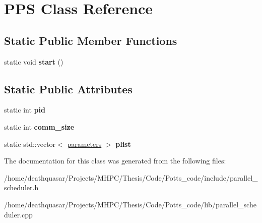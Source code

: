\hypertarget{class_p_p_s}{}\section{P\+P\+S Class Reference}
\label{class_p_p_s}
\subsection*{Static Public Member Functions}
\begin{DoxyCompactItemize}
\item 
\hypertarget{class_p_p_s_a25cae7ae5a03f02d8c44b2b9b163ebe6}{}static void {\bfseries start} ()\label{class_p_p_s_a25cae7ae5a03f02d8c44b2b9b163ebe6}

\end{DoxyCompactItemize}
\subsection*{Static Public Attributes}
\begin{DoxyCompactItemize}
\item 
\hypertarget{class_p_p_s_a4e924fe2bb5ac2451243e7adc4f943ef}{}static int {\bfseries pid}\label{class_p_p_s_a4e924fe2bb5ac2451243e7adc4f943ef}

\item 
\hypertarget{class_p_p_s_a499131be4386ab41cf334cf42170518e}{}static int {\bfseries comm\+\_\+size}\label{class_p_p_s_a499131be4386ab41cf334cf42170518e}

\item 
\hypertarget{class_p_p_s_a0e5dcc27effd740a9d7b8d65356b80c1}{}static std\+::vector$<$ \hyperlink{structparameters}{parameters} $>$ {\bfseries plist}\label{class_p_p_s_a0e5dcc27effd740a9d7b8d65356b80c1}

\end{DoxyCompactItemize}


The documentation for this class was generated from the following files\+:\begin{DoxyCompactItemize}
\item 
/home/deathquasar/\+Projects/\+M\+H\+P\+C/\+Thesis/\+Code/\+Potts\+\_\+code/include/parallel\+\_\+scheduler.\+h\item 
/home/deathquasar/\+Projects/\+M\+H\+P\+C/\+Thesis/\+Code/\+Potts\+\_\+code/lib/parallel\+\_\+scheduler.\+cpp\end{DoxyCompactItemize}
